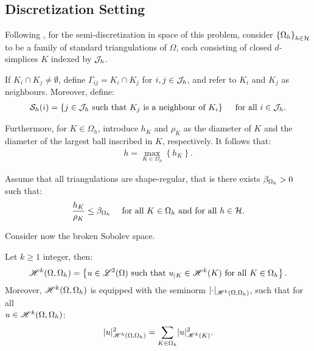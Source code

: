 \subsection{Discretization Setting}

Following \cite{Feistauer2004}, for the semi-discretization in space of this problem, consider $\left\{ \Omega_{h} \right\}_{h \in \mathcal{H}}$ to be a family of standard triangulations of $\Omega$, each consisting of closed $d$-simplices $K$ indexed by $\mathcal{J}_h$. %

If $K_i \cap K_j \neq \emptyset$, define $\Gamma_{ij} = K_i \cap K_j$ for $i, j \in \mathcal{J}_h$, and refer to $K_i$ and $K_j$ as neighbours. Moreover, define:
\begin{gather}
    \mathcal{S}_h(i) = \left\{ j \in \mathcal{J}_h \text{ such that } K_j \text{ is a neighbour of } K_i \right\} \quad \text{ for all } i \in \mathcal{J}_h.
\end{gather}

Furthermore, for $K \in \Omega_h$, introduce $h_K$ and $\rho_K$ as the diameter of $K$ and the diameter of the largest ball inscribed in $K$, respectively. It follows that:
\begin{gather}
    h = \max_{K \in \Omega_h} \left\{ h_K \right\}.
\end{gather}

Assume that all triangulations are shape-regular, that is there exists $\beta_{\Omega_h} > 0$ such that:
\begin{gather}
    \frac{h_K}{\rho_K} \leq \beta_{\Omega_h} \quad \text{ for all } K \in \Omega_h \text{ and for all } h \in \mathcal{H}.
\end{gather}

Consider now the broken Sobolev space.
\begin{definition} %
    Let $k \geq 1$ integer, then:
    \begin{gather}
        \mathscr{H}^{k}(\Omega, \Omega_h) = \left\{ u \in \mathscr{L}^{2}(\Omega) \text{ such that } u_{\mid K} \in \mathscr{H}^{k}(K) \text{ for all } K \in \Omega_h \right\}.
    \end{gather}
    Moreover, $\mathscr{H}^{k}(\Omega, \Omega_h)$ is equipped with the seminorm $\lvert \cdot \rvert_{\mathscr{H}^{k}(\Omega, \Omega_h)}$, such that for all \\ $u \in \mathscr{H}^{k}(\Omega, \Omega_h)$:
    \begin{gather}
        \lvert u \rvert_{\mathscr{H}^{k}(\Omega, \Omega_h)}^2 = \sum_{K \in \Omega_h} \lvert u \rvert_{\mathscr{H}^{k}(K)}^2.
    \end{gather}
\end{definition}

